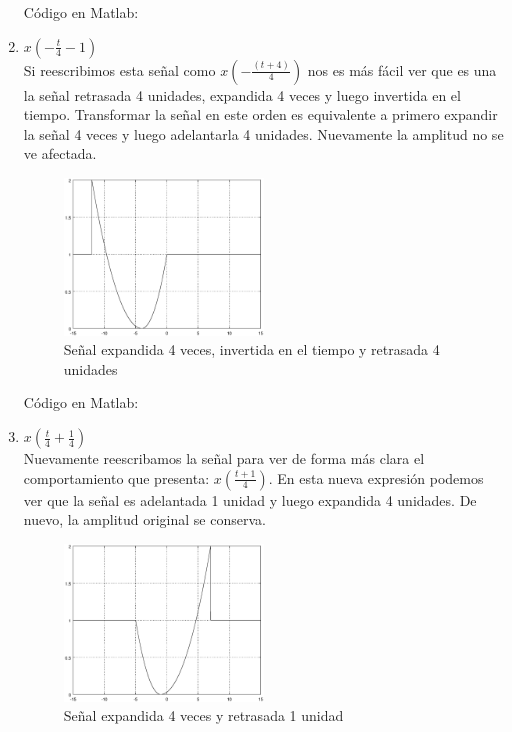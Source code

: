 \documentclass[10pt,a4paper]{report}
\begin{document}
\begin{enumerate}
Código en Matlab:
    
    
  \item $x\left(-\frac{t}{4}-1\right)$\\
  \newline Si reescribimos esta señal como $x\left(-\frac{\left(t+4\right)}{4}\right)$ nos es más fácil ver que es una la señal retrasada 4 unidades, expandida 4 veces y luego invertida en el tiempo. Transformar la señal en este orden es equivalente a primero expandir la señal 4 veces y luego adelantarla 4 unidades. Nuevamente la amplitud no se ve afectada.

    \begin{figure}[H]
      \begin{center}
        \includegraphics[width=0.5\textwidth]{Ejercicio2/IncisoC}
        \caption{Señal expandida 4 veces, invertida en el tiempo y retrasada 4 unidades}
        \label{fig:IncisoC}
      \end{center}
    \end{figure}
    
Código en Matlab:
    
    \newpage

  \item $x\left(\frac{t}{4}+\frac{1}{4}\right)$\\
  \newline Nuevamente reescribamos la señal para ver de forma más clara el comportamiento que presenta: $x\left(\frac{t+1}{4}\right)$. En esta nueva expresión podemos ver que la señal es adelantada 1 unidad y luego expandida 4 unidades. De nuevo, la amplitud original se conserva.
    \begin{figure}[H]
      \begin{center}
        \includegraphics[width=0.5\textwidth]{Ejercicio2/IncisoD}
        \caption{Señal expandida 4 veces y retrasada 1 unidad}
        \label{fig:IncisoD}
      \end{center}
    \end{figure}
    

\end{enumerate}
\end{document}
